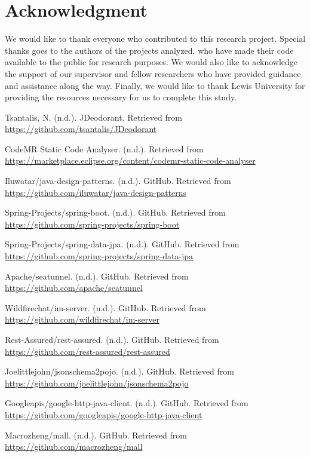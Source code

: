 \documentclass[conference]{IEEEtran}
\begin{document}
	\section{Acknowledgment}
	We would like to thank everyone who contributed to this research project. Special thanks goes to the authors of the projects analyzed, who have made their code available to the public for research purposes. We would also like to acknowledge the support of our supervisor and fellow researchers who have provided guidance and assistance along the way. Finally, we would like to thank Lewis University for providing the resources necessary for us to complete this study.
	
	\begin{thebibliography}{00}

 Tsantalis, N. (n.d.). JDeodorant. Retrieved from \url{https://github.com/tsantalis/JDeodorant}

 CodeMR Static Code Analyser. (n.d.). Retrieved from \url{https://marketplace.eclipse.org/content/codemr-static-code-analyser}

 Iluwatar/java-design-patterns. (n.d.). GitHub. Retrieved from \url{https://github.com/iluwatar/java-design-patterns}

 Spring-Projects/spring-boot. (n.d.). GitHub. Retrieved from \url{https://github.com/spring-projects/spring-boot}

 Spring-Projects/spring-data-jpa. (n.d.). GitHub. Retrieved from \url{https://github.com/spring-projects/spring-data-jpa}

 Apache/seatunnel. (n.d.). GitHub. Retrieved from \url{https://github.com/apache/seatunnel}

 Wildfirechat/im-server. (n.d.). GitHub. Retrieved from \url{https://github.com/wildfirechat/im-server}

 Rest-Assured/rest-assured. (n.d.). GitHub. Retrieved from \url{https://github.com/rest-assured/rest-assured}

 Joelittlejohn/jsonschema2pojo. (n.d.). GitHub. Retrieved from \url{https://github.com/joelittlejohn/jsonschema2pojo}

 Googleapis/google-http-java-client. (n.d.). GitHub. Retrieved from \url{https://github.com/googleapis/google-http-java-client}

 Macrozheng/mall. (n.d.). GitHub. Retrieved from \url{https://github.com/macrozheng/mall}

\end{thebibliography}
\end{document}
